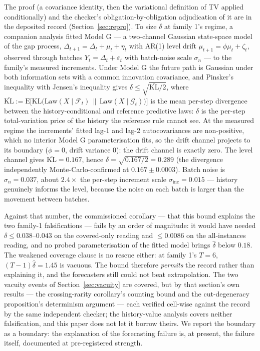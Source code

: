 \documentclass[11pt]{article}
\begin{document}
The proof (a covariance identity, then the variational
definition of TV applied conditionally) and the checker's
obligation-by-obligation adjudication of it are in the deposited
record (Section~\ref{sec:repro}). To size $\delta$ at family 1's
regime, a companion analysis fitted Model G --- a two-channel
Gaussian state-space model of the gap process, $\Delta_{t+1} =
\Delta_t + \mu_t + \eta_t$ with AR(1) level drift $\mu_{t+1} =
\phi\mu_t + \zeta_t$, observed through batches $Y_t = \Delta_t +
\varepsilon_t$ with batch-noise scale $\sigma_n$ --- to the
family's measured increments. Under Model G the future path is
Gaussian under both information sets with a common innovation
covariance, and Pinsker's inequality with Jensen's inequality
gives $\delta \le \sqrt{\bar{\mathrm{KL}}/2}$, where
$\bar{\mathrm{KL}} := \mathrm{E}\bigl[\mathrm{KL}\bigl(
\mathrm{Law}(X \mid \mathcal{F}_t) \,\|\, \mathrm{Law}(X \mid
\mathcal{G}_t)\bigr)\bigr]$ is the mean per-step divergence
between the history-conditional and reference predictive laws:
$\delta$ is the per-step total-variation price of the history
the reference rule cannot see. At the measured regime the
increments' fitted lag-1 and lag-2 autocovariances are
non-positive, which no interior Model G parameterisation fits,
so the drift channel projects to its boundary ($\phi = 0$,
drift variance $0$): the drift channel is exactly zero. The
level channel gives $\bar{\mathrm{KL}} = 0.167$, hence
$\hat\delta = \sqrt{0.167/2} = 0.289$ (the divergence
independently Monte-Carlo-confirmed at $0.167 \pm 0.0003$).
Batch noise is $\sigma_n = 0.037$, about $2.4\times$ the
per-step increment scale $\sigma_{\mathrm{inc}} = 0.015$ ---
history genuinely informs the level, because the noise on each
batch is larger than the movement between batches.

Against that number, the commissioned corollary --- that this
bound explains the two family-1 falsifications --- fails by an
order of magnitude: it would have needed $\delta \le
0.038$--$0.043$ on the covered-only reading and $\le 0.0086$ on
the all-instances reading, and no probed parameterisation of
the fitted model brings $\hat\delta$ below $0.18$. The weakened
coverage clause is no rescue either: at family 1's $T = 6$,
$(T-1)\hat\delta = 1.45$ is vacuous. The bound therefore
\emph{permits} the record rather than explaining it, and the
forecasters still could not beat extrapolation. The two vacuity
events of Section~\ref{sec:vacuity} are covered, but by that
section's own results --- the crossing-rarity corollary's
counting bound and the cut-degeneracy proposition's determinism
argument --- each verified cell-wise against the record by the
same independent checker; the history-value analysis covers
neither falsification, and this paper does not let it borrow
theirs. We report the boundary as a boundary: the explanation
of the forecasting failure is, at present, the failure itself,
documented at pre-registered strength.
\end{document}
